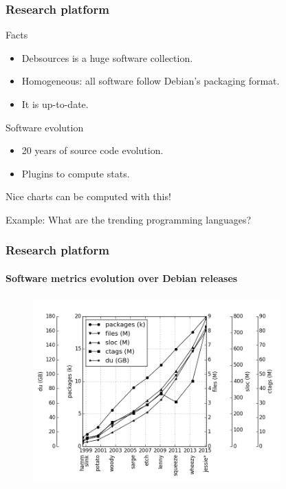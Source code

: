 \documentclass{beamer}
\begin{document}
\begin{frame}
  \frametitle{Research platform}
  \begin{block}{Facts}
    \begin{itemize}
    \item Debsources is a \alert{huge} software collection.
    \item Homogeneous: all software follow Debian's packaging format.
    \item It is up-to-date.
    \end{itemize}
  \end{block}
  \pause
  
  \begin{block}{Software evolution}
    \begin{itemize}
    \item 20 years of source code evolution.
    \item Plugins to compute stats.
    \end{itemize}
  \end{block}
  \pause
  
  \alert{Nice charts can be computed with this!}

  Example: What are the trending programming languages?
\end{frame}

\begin{frame}
  \frametitle{Research platform}
  \framesubtitle{Software metrics evolution over Debian releases}
  \vspace{-0.3cm}
  \begin{figure}
    \centering
    \includegraphics[width=0.85\textwidth]{img/size-combined}
  \end{figure}
\end{frame}
\end{document}
